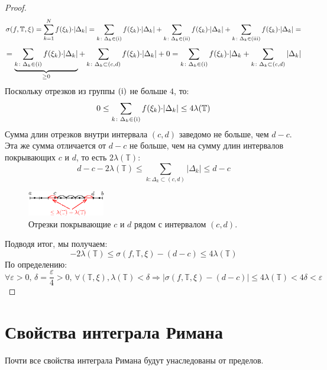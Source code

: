 \documentclass[12pt]{article}
\newcommand{\RN}[1]{%
	\textup{\uppercase\expandafter{\romannumeral#1}}%
}
\newcommand{\MTB}{\mathbb{T}}
\newcommand{\VE}{\varepsilon}
\theoremstyle{definition}
\begin{document}
\begin{enumerate}[label={\arabic*)}]
\begin{proof}
		$$
			\sigma(f, \MTB, \xi) = \displaystyle \sum\limits_{k = 1}^{N}f(\xi_k){\cdot}|\Delta_k| = \displaystyle \sum\limits_{k \colon \Delta_k \in (\RN{1})}f(\xi_k){\cdot}|\Delta_k| + \displaystyle \sum\limits_{k \colon \Delta_k \in (\RN{2})}f(\xi_k){\cdot}|\Delta_k| + \displaystyle \sum\limits_{k \colon \Delta_k \in (\RN{3})}f(\xi_k){\cdot}|\Delta_k| = 
		$$
		$$
			= \underbrace{\displaystyle \sum\limits_{k \colon \Delta_k \in (\RN{1})}f(\xi_k){\cdot}|\Delta_k|}_{ \geq 0} + \displaystyle \sum\limits_{k \colon \Delta_k \subset (c,d)}f(\xi_k){\cdot}|\Delta_k| + 0 = \displaystyle \sum\limits_{k \colon \Delta_k \in (\RN{1})}f(\xi_k){\cdot}|\Delta_k + \displaystyle \sum\limits_{k \colon \Delta_k \subset (c,d)}|\Delta_k|
		$$
		Поскольку отрезков из группы $(\RN{1})$ не больше $4$, то:
		$$
			0 \leq \displaystyle \sum\limits_{k \colon \Delta_k \in (\RN{1})}f(\xi_k){\cdot}|\Delta_k| \leq 4 \lambda(\MTB)
		$$
		Сумма длин отрезков внутри интервала $(c,d)$ заведомо не больше, чем $d - c$. Эта же сумма отличается от $d-c$ не больше, чем на сумму длин интервалов покрывающих $c$ и $d$, то есть $2\lambda(\MTB)$:
		$$
			d-c - 2 \lambda(\MTB) \leq \displaystyle \sum\limits_{k \colon \Delta_k \subset (c,d)}|\Delta_k| \leq d - c
		$$
		\begin{figure}[H]
			\centering
			\includegraphics[width=0.3\textwidth]{21_4.eps}
			\caption{Отрезки покрывающие $c$ и $d$ рядом с интервалом $(c,d)$.}
			\label{21_4}
		\end{figure}
		Подводя итог, мы получаем:
		$$
			 -2 \lambda(\MTB) \leq \sigma(f, \MTB, \xi) - (d - c)  \leq 4 \lambda(\MTB)
		$$
		По определению:
		$$
			\forall \VE > 0, \, \delta = \dfrac{\VE}{4} > 0, \, \forall (\MTB, \xi), \lambda(\MTB) < \delta \Rightarrow |\sigma(f, \MTB, \xi) - (d - c)| \leq 4 \lambda(\MTB) < 4 \delta < \VE
		$$
	\end{proof}
\end{enumerate}
\section*{Свойства интеграла Римана}
Почти все свойства интеграла Римана будут унаследованы от пределов.
\end{document}
